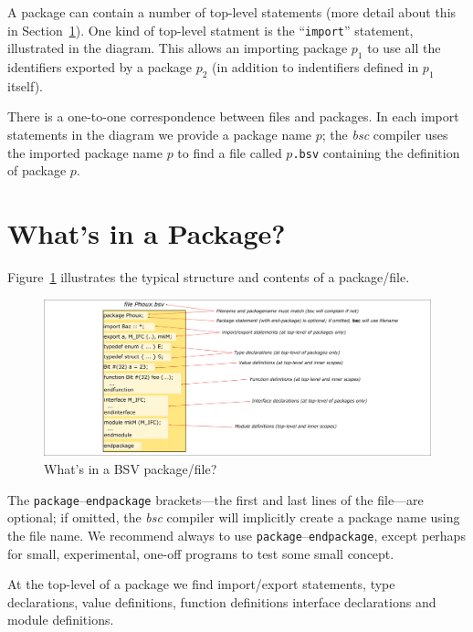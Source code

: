 A package can contain a number of top-level statements (more detail
about this in Section~\ref{Sec_package_contents}).  One kind of
top-level statment is the ``\verb|import|'' statement, illustrated in
the diagram.  This allows an importing package $p_1$ to use all the
identifiers exported by a package $p_2$ (in addition to indentifiers
defined in $p_1$ itself).

There is a one-to-one correspondence between files and packages.  In
each import statements in the diagram we provide a package name $p$;
the \emph{bsc} compiler uses the imported package name $p$ to find a
file called $p$\verb|.bsv| containing the definition of package $p$.


\section{What's in a Package?}

\label{Sec_package_contents}

Figure~\ref{Fig_BSV_Package} illustrates the typical
structure and contents of a package/file.
\begin{figure}[htbp]
  \centerline{\includegraphics[width=6in,angle=0]{Figures/Fig_BSV_Package}}
  \caption{\label{Fig_BSV_Package}
           What's in a BSV package/file?}
\end{figure}

The \verb|package|--\verb|endpackage| brackets---the first and last
lines of the file---are optional; if omitted, the \emph{bsc} compiler
will implicitly create a package name using the file name.  We
recommend always to use \verb|package|--\verb|endpackage|, except
perhaps for small, experimental, one-off programs to test some small
concept.

At the top-level of a package we find import/export statements, type
declarations, value definitions, function definitions interface
declarations and module definitions.

